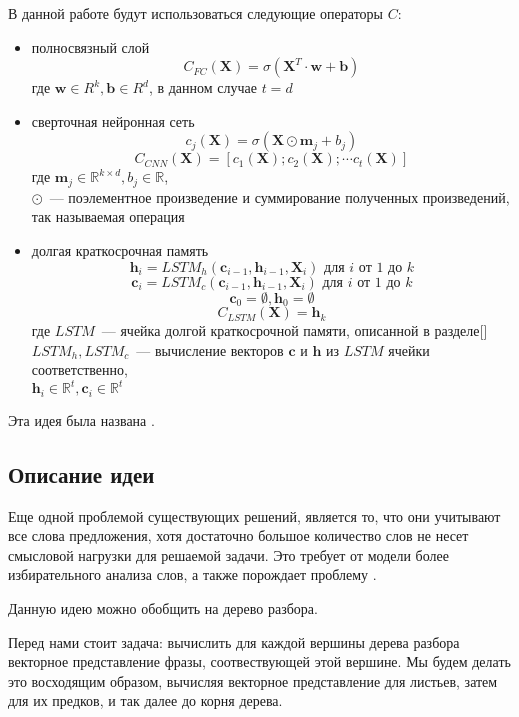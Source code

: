 \vspace{5mm}

\noindent В данной работе будут использоваться следующие операторы $C$:
\begin{itemize}
    \item{полносвязный слой}
        $$C_{FC}(\pmb{X})=\sigma(\pmb{X}^T \cdot \pmb{w} + \pmb{b})$$
        где $\pmb{w} \in R^k, \pmb{b} \in R^d$, в данном случае $t=d$
    \item{сверточная нейронная сеть}
        $$c_j(\pmb{X})=\sigma(\pmb{X} \odot \pmb{m}_j + b_j)$$
        $$C_{CNN}(\pmb{X})=[c_1(\pmb{X}); c_2(\pmb{X}); \cdots c_t(\pmb{X})]$$
        где $\pmb{m}_j \in \mathbb{R}^{k \times d}, b_j \in \mathbb{R}$,\\
        $\odot$~--- поэлементное произведение и суммирование полученных произведений, 
        так называемая операция 
    \item{долгая краткосрочная память}
    $$\pmb{h}_i=LSTM_h(\pmb{c}_{i-1}, \pmb{h}_{i-1}, \pmb{X}_i) \text{ для } i \text{ от } 1 \text { до } k$$  
    $$\pmb{c}_i=LSTM_c(\pmb{c}_{i-1}, \pmb{h}_{i-1}, \pmb{X}_i) \text{ для } i \text{ от } 1 \text { до } k$$ 
    $$\pmb{c}_0 = \emptyset, \pmb{h}_0 = \emptyset$$
    $$C_{LSTM}(\pmb{X}) = \pmb{h}_k$$
    где $LSTM$~--- ячейка долгой краткосрочной памяти, описанной в разделе[]\\
    $LSTM_h, LSTM_c$~--- вычисление векторов $\pmb{c}$ и $\pmb{h}$ из $LSTM$ ячейки соответственно,\\
    $\pmb{h}_i \in \mathbb{R}^t, \pmb{c}_i \in \mathbb{R}^t$
\end{itemize}

\noindent Эта идея была названа .

\subsection{Описание идеи } 
Еще одной проблемой существующих решений, является то, 
что они учитывают все слова предложения, 
хотя достаточно большое количество слов не несет смысловой нагрузки для решаемой задачи.
Это требует от модели более избирательного анализа слов, а также порождает проблему .


Данную идею можно обобщить на дерево разбора.

Перед нами стоит задача: вычислить для каждой вершины дерева разбора 
векторное представление фразы, соотвествующей этой вершине.
Мы будем делать это восходящим образом, вычисляя векторное представление для листьев,
затем для их предков, и так далее до корня дерева.

